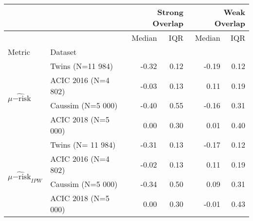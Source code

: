 \begin{tabular}{llrrrr}
    \toprule
                                                                 &           &
    \multicolumn{2}{r}{Strong
    Overlap}                                                     &
    \multicolumn{2}{r}{Weak
        Overlap}
    \\ \midrule
                                                                 &           & Median & IQR   & Median & IQR \\
    Metric                                                       & Dataset   &        &       &        &     \\
    \midrule
    \multirow[c]{4}{*}{$\widehat{\mu\mathrm{-risk}}$}            & Twins
    (N=11 984)                                                   & -0.32     & 0.12   & -0.19 & 0.12         \\
    \cline{2-6}
                                                                 & ACIC 2016
    (N=4 802)                                                    & -0.03     & 0.13   & 0.11  & 0.19         \\
    \cline{2-6}
                                                                 & Caussim
    (N=5 000)                                                    & -0.40     & 0.55   & -0.16 & 0.31         \\
    \cline{2-6}
                                                                 & ACIC 2018
    (N=5 000)                                                    & 0.00      & 0.30   & 0.01  & 0.40         \\
    \cline{1-6} \cline{2-6}
    \multirow[c]{4}{*}{$\widehat{\mu\mathrm{-risk}}_{IPW}$}      & Twins
    (N= 11 984)                                                  & -0.31     & 0.13   & -0.17 & 0.12         \\
    \cline{2-6}
                                                                 & ACIC 2016
    (N=4 802)                                                    & -0.02     & 0.13   & 0.11  & 0.19         \\
    \cline{2-6}
                                                                 & Caussim
    (N=5 000)                                                    & -0.34     & 0.50   & 0.09  & 0.31         \\
    \cline{2-6}
                                                                 & ACIC 2018
    (N=5 000)                                                    & 0.00      & 0.30   & -0.01 & 0.43         \\

\end{tabular}
